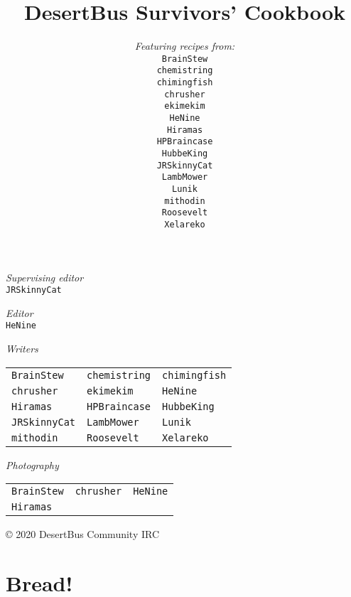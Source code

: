 \documentclass[12pt,a4paper,twoside]{book}
\title{DesertBus Survivors' Cookbook}
\author{\textit{Featuring recipes from:}\\
		\texttt{BrainStew}\\%
		\texttt{chemistring}\\%
		\texttt{chimingfish}\\%
		\texttt{chrusher}\\%
		\texttt{ekimekim}\\%
		\texttt{HeNine}\\%
		\texttt{Hiramas}\\%
		\texttt{HPBraincase}\\%
		\texttt{HubbeKing}\\%
		\texttt{JRSkinnyCat}\\%
		\texttt{LambMower}\\%
		\texttt{Lunik}\\%
		\texttt{mithodin}\\%
		\texttt{Roosevelt}\\%
		\texttt{Xelareko}
}
\begin{document}
	\frontmatter
	\maketitle

	\newpage

	\null
	\vfill

	\textit{Supervising editor}\\
	\texttt{JRSkinnyCat}

	\textit{Editor}\\
	\texttt{HeNine}


	\textit{Writers}\\

	\vspace{-1.8em}
	\hspace*{-0.45em}\begin{tabular}{lll}
	\texttt{BrainStew} &
	\texttt{chemistring} &
	\texttt{chimingfish}\\
	\texttt{chrusher} &
	\texttt{ekimekim} &
	\texttt{HeNine}\\
	\texttt{Hiramas} &
	\texttt{HPBraincase} &
	\texttt{HubbeKing}\\
	\texttt{JRSkinnyCat} &
	\texttt{LambMower} &
	\texttt{Lunik}\\
	\texttt{mithodin} &
	\texttt{Roosevelt} &
	\texttt{Xelareko}
	\end{tabular}

	\textit{Photography}\\

	\vspace{-1.8em}
	\hspace*{-0.45em}\begin{tabular}{lll}
		\texttt{BrainStew} &
		\texttt{chrusher} &
		\texttt{HeNine}\\
		\texttt{Hiramas}&&
	\end{tabular}

	\vspace{1in}
	© 2020 DesertBus Community IRC

	\newpage
	\newpage
	\tableofcontents
	\clearpage

	\mainmatter
	\chapter{Bread!}
	\clearpage

	
	\clearpage
	
	\clearpage
	
	\clearpage
\end{document}

